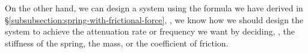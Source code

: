 \documentclass[12pt]{article}
\begin{document}
On the other hand,
we can design a system
using the formula we have derived in \S\ref{subsubsection:spring-with-frictional-force},
\ie,
we know how we should design the system to achieve the attenuation rate or frequency we want
by deciding,
\eg,
the stiffness of the spring,
the mass,
or the coefficient of friction.

%
%
%
%
%
%

%

\end{document}

